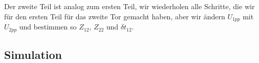 \par Der zweite Teil ist analog zum ersten Teil, wir wiederholen alle Schritte, die wir für den ersten Teil für das zweite Tor gemacht haben, aber wir ändern $U_{1pp}$ mit $U_{2pp}$ und bestimmen so $Z_{12}$, $Z_{22}$ und $\delta t_{12}$.
%
%
%
\begin{flushright}
  \textit{\autorA}
\end{flushright}
%
%
%
%
\subsection{Simulation}
\label{subsec:3_Simulation}
%
%

%
%
%
\begin{flushright}
  \textit{\autorA}
\end{flushright}
%
%
%
%